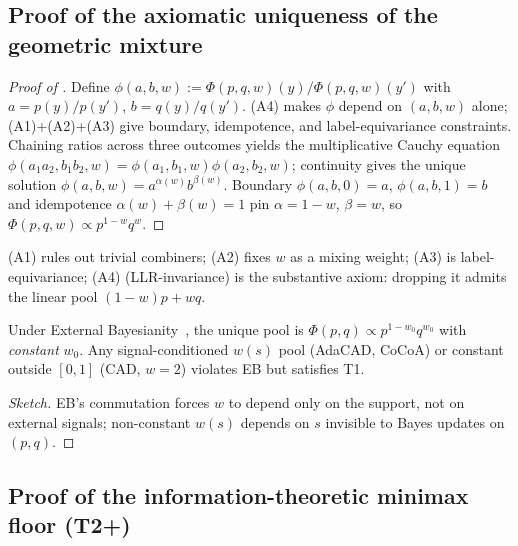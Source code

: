 \subsection{Proof of the axiomatic uniqueness of the geometric mixture}
\label{app:thm1-axiomatic}

\begin{proof}[Proof of ]
Define $\phi(a,b,w)\!:=\!\Phi(p,q,w)(y)/\Phi(p,q,w)(y')$ with
$a\!=\!p(y)/p(y')$, $b\!=\!q(y)/q(y')$.  (A4) makes $\phi$
depend on $(a,b,w)$ alone; (A1)+(A2)+(A3) give boundary,
idempotence, and label-equivariance constraints.  Chaining
ratios across three outcomes yields the multiplicative Cauchy
equation
$\phi(a_1a_2,b_1b_2,w)\!=\!\phi(a_1,b_1,w)\phi(a_2,b_2,w)$;
continuity gives the unique solution
$\phi(a,b,w)\!=\!a^{\alpha(w)}b^{\beta(w)}$.  Boundary
$\phi(a,b,0)\!=\!a$, $\phi(a,b,1)\!=\!b$ and idempotence
$\alpha(w)\!+\!\beta(w)\!=\!1$ pin $\alpha\!=\!1\!-\!w$,
$\beta\!=\!w$, so $\Phi(p,q,w)\!\propto\!p^{1-w}q^{w}$.
\end{proof}

\begin{remark}
(A1) rules out trivial combiners; (A2) fixes $w$ as a mixing
weight; (A3) is label-equivariance; (A4) (LLR-invariance) is the
substantive axiom: dropping it admits the linear pool $(1\!-\!w)p\!+\!wq$.
\end{remark}

\begin{lemma}
\label{lem:eb-excludes-adaptive}
Under External Bayesianity~\citep[Thm.~3.1]{genest1986characterization},
the unique pool is $\Phi(p,q)\!\propto\!p^{1-w_0}q^{w_0}$ with
\emph{constant} $w_0$.  Any signal-conditioned $w(s)$ pool
(AdaCAD, CoCoA) or constant outside $[0,1]$ (CAD, $w\!=\!2$)
violates EB but satisfies T1.
\end{lemma}

\begin{proof}[Sketch]
EB's commutation forces $w$ to depend only on the support, not on
external signals; non-constant $w(s)$ depends on $s$ invisible to
Bayes updates on $(p,q)$.
\end{proof}


\subsection{Proof of the information-theoretic minimax floor (T2+)}
\label{app:thm2-info}

